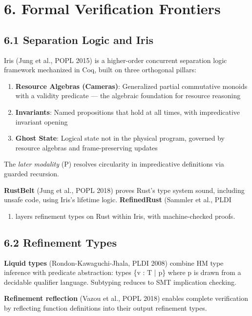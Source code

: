 \documentclass[11pt]{article}
\begin{document}
\section{6. Formal Verification Frontiers}
\label{sec:org3507473}

\subsection{6.1 Separation Logic and Iris}
\label{sec:orgd124c6f}

Iris (Jung et al., POPL 2015) is a higher-order concurrent separation logic
framework mechanized in Coq, built on three orthogonal pillars:

\begin{enumerate}
\item \textbf{Resource Algebras (Cameras)}: Generalized partial commutative monoids with
a validity predicate --- the algebraic foundation for resource reasoning
\item \textbf{Invariants}: Named propositions that hold at all times, with impredicative
invariant opening
\item \textbf{Ghost State}: Logical state not in the physical program, governed by
resource algebras and frame-preserving updates
\end{enumerate}

The \emph{later modality} (\triangleright P) resolves circularity in impredicative
definitions via guarded recursion.

\textbf{RustBelt} (Jung et al., POPL 2018) proves Rust's type system sound, including
unsafe code, using Iris's lifetime logic. \textbf{RefinedRust} (Sammler et al., PLDI
\begin{enumerate}
\item layers refinement types on Rust within Iris, with machine-checked proofs.
\end{enumerate}
\subsection{6.2 Refinement Types}
\label{sec:org0b467d2}

\textbf{Liquid types} (Rondon-Kawaguchi-Jhala, PLDI 2008) combine HM type inference
with predicate abstraction: types \{v : T | p\} where p is drawn from a decidable
qualifier language. Subtyping reduces to SMT implication checking.

\textbf{Refinement reflection} (Vazou et al., POPL 2018) enables complete verification
by reflecting function definitions into their output refinement types.
\end{document}
